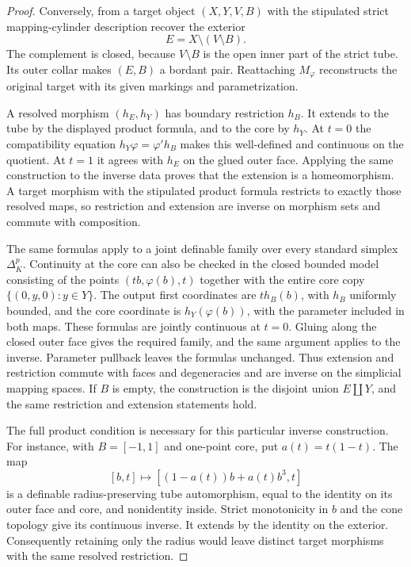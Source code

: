 \begin{proof}
Conversely, from a target object $(X,Y,V,B)$ with the stipulated
strict mapping-cylinder description recover the exterior
\[
 E=X\setminus(V\setminus B).
\]
The complement is closed, because $V\setminus B$ is the open
inner part of the strict tube.  Its outer collar makes $(E,B)$
a bordant pair.  Reattaching $M_\varphi$ reconstructs the original
target with its given markings and parametrization.

A resolved morphism $(h_E,h_Y)$ has boundary restriction $h_B$.
It extends to the tube by the displayed product formula, and to
the core by $h_Y$.  At $t=0$ the compatibility equation
$h_Y\varphi=\varphi'h_B$ makes this well-defined and continuous
on the quotient.  At $t=1$ it agrees with $h_E$ on the glued
outer face.  Applying the same construction to the inverse data
proves that the extension is a homeomorphism.  A target morphism
with the stipulated product formula restricts to exactly those
resolved maps, so restriction and extension are inverse on
morphism sets and commute with composition.

The same formulas apply to a joint definable family over every
standard simplex $\Delta^p_K$.  Continuity at the core can also
be checked in the closed bounded model consisting of the points
$(tb,\varphi(b),t)$ together with the entire core copy
$\{(0,y,0):y\in Y\}$. The output first coordinates are $t h_B(b)$,
with $h_B$ uniformly bounded, and the core coordinate is
$h_Y(\varphi(b))$, with the parameter included in both maps.
These formulas are jointly continuous at $t=0$.  Gluing along
the closed outer face gives the required family, and the same
argument applies to the inverse.  Parameter pullback leaves
the formulas unchanged.
Thus extension and restriction commute with faces and
degeneracies and are inverse on the simplicial mapping spaces.
If $B$ is empty, the construction is the disjoint union $E\amalg Y$,
and the same restriction and extension statements hold.

The full product condition is necessary for this particular
inverse construction.  For instance, with $B=[-1,1]$ and
one-point core, put $a(t)=t(1-t)$.  The map
\[
 [b,t]\longmapsto
 [(1-a(t))b+a(t)b^3,t]
\]
is a definable radius-preserving tube automorphism, equal to the
identity on its outer face and core, and nonidentity inside.
Strict monotonicity in $b$ and the cone topology give its
continuous inverse.  It extends by the identity on the exterior.
Consequently retaining only the radius would leave distinct
target morphisms with the same resolved restriction.
\end{proof}
